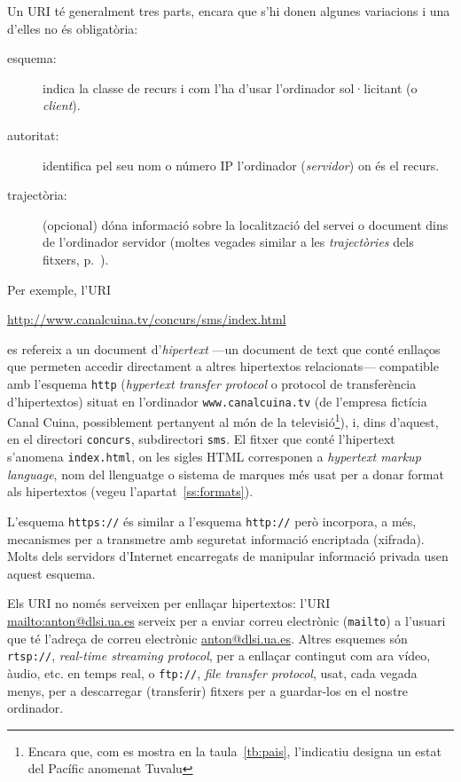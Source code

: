 Un URI té generalment tres parts, encara que s'hi donen algunes
variacions i una d'elles no és obligatòria:
\begin{description}
\item[esquema:] indica la classe de recurs i com l'ha d'usar
  l'ordinador sol·licitant (o \emph{client}).
\item[autoritat:] identifica pel seu nom o número IP l'ordinador
  (\emph{servidor}) on és el recurs.
\item[trajectòria:] (opcional) dóna informació sobre la localització
  del servei o document dins de l'ordinador servidor (moltes vegades
  similar a les \emph{trajectòries} dels fitxers,
  p.~\pageref{pg:fitxer}).
\end{description}
Per exemple, l'URI
\begin{center}
\url{http://www.canalcuina.tv/concurs/sms/index.html}
\end{center}
es refereix a un document d'\emph{hipertext} ---un document de text
que conté enllaços que permeten accedir directament a altres
hipertextos relacionats--- compatible amb l'esquema \texttt{http}
(\emph{hypertext transfer protocol} o protocol de transferència
d'hipertextos) situat en l'ordinador \texttt{www.canalcuina.tv} (de
l'empresa fictícia Canal Cuina, possiblement pertanyent al món de la
televisió\footnote{Encara que, com es mostra en la
  taula~\ref{tb:pais}, l'indicatiu designa un estat del Pacífic
  anomenat Tuvalu}), i, dins d'aquest, en el directori
\texttt{concurs}, subdirectori \texttt{sms}. El fitxer que conté
l'hipertext s'anomena \texttt{index.html}, on les sigles HTML
corresponen a \emph{hypertext markup language}, nom del llenguatge o
sistema de marques més usat per a donar format als hipertextos (vegeu
l'apartat~\ref{ss:formats}).

L'esquema {\tt https://} és similar a l'esquema {\tt http://} però
incorpora, a més, mecanismes per a transmetre amb seguretat informació
encriptada (xifrada). Molts dels servidors d'Internet encarregats de
manipular informació privada usen aquest esquema.

Els URI no només serveixen per enllaçar hipertextos: l'URI
\url{mailto:anton@dlsi.ua.es} serveix per a enviar correu electrònic
(\texttt{mailto}) a l'usuari que té l'adreça de correu electrònic
\url{anton@dlsi.ua.es}. Altres esquemes són \texttt{rtsp://},
\emph{real-time streaming protocol}, per a enllaçar contingut com ara
vídeo, àudio, etc. en temps real, o {\tt ftp://}, \emph{file transfer
  protocol}, usat, cada vegada menys, per a descarregar (transferir)
fitxers per a guardar-los en el nostre ordinador\label{pg:ftp}.


